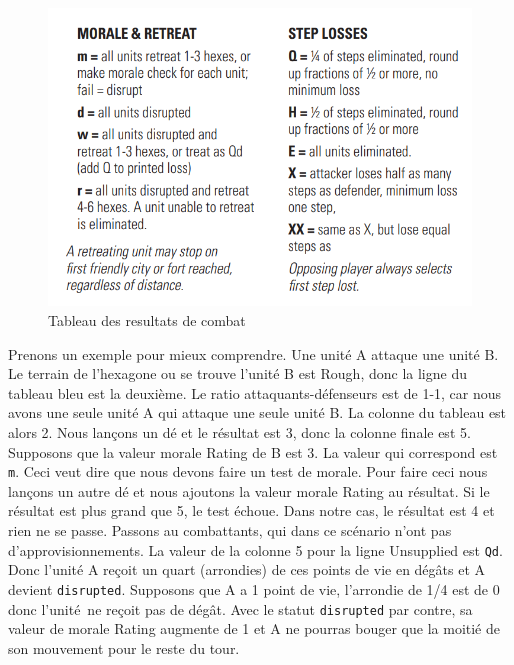 \begin{figure}[H]
\centering
\includegraphics[scale=0.25]{data/morale_et_retraite.png}
\caption{Tableau des resultats de combat}
\end{figure}

Prenons un exemple pour mieux comprendre. Une unité A attaque une unité B. Le terrain de l'hexagone ou se trouve l'unité B est Rough, donc la ligne du tableau bleu est la deuxième.
Le ratio attaquants-défenseurs est de 1-1, car nous avons une seule unité A qui attaque une seule unité B. La colonne du tableau est alors 2.
Nous lançons un dé et le résultat est 3, donc la colonne finale est 5. Supposons que la valeur morale Rating de B est 3.
La valeur qui correspond est {\tt m}. Ceci veut dire que nous devons faire un test de morale.
Pour faire ceci nous lançons un autre dé et nous ajoutons la valeur morale Rating au résultat. Si le résultat est plus grand que 5, le test échoue.
Dans notre cas, le résultat est 4 et rien ne se passe. Passons au combattants, qui dans ce scénario
n'ont pas d'approvisionnements. La valeur de la colonne 5 pour la ligne Unsupplied est {\tt Qd}.
Donc l'unité A reçoit un quart (arrondies) de ces points de vie en dégâts et A devient {\tt disrupted}.
Supposons que A a 1 point de vie, l'arrondie de 1/4 est de 0 donc l'unité ne reçoit pas de dégât.
Avec le statut {\tt disrupted} par contre, sa valeur de morale Rating augmente de 1 et A ne pourras bouger que la moitié de son mouvement pour le reste du tour.